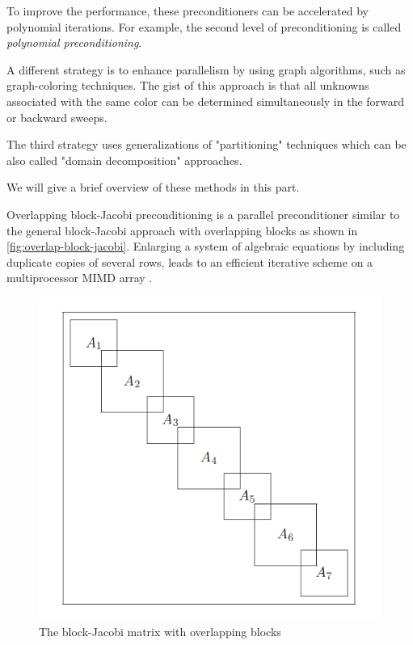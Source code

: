To improve the performance, these preconditioners can be accelerated by polynomial iterations. For example, the second level of preconditioning is called \textit{polynomial preconditioning}.

A different strategy is to enhance parallelism by using graph algorithms, such as graph-coloring techniques. The gist of this approach is that all unknowns associated with the same color can be determined simultaneously in the forward or backward sweeps.

The third strategy uses generalizations of "partitioning" techniques which can be also called "domain decomposition" approaches.

We will give a brief overview of these methods in this part.

Overlapping block-Jacobi preconditioning is a parallel preconditioner similar to the general block-Jacobi approach with overlapping blocks as shown in \autoref{fig:overlap-block-jacobi}. Enlarging a system of algebraic equations by including duplicate copies of several rows, leads to an efficient iterative scheme on a multiprocessor MIMD array \cite{WAIT1988325}. 
\begin{figure}[h!]
    \centering
    \includegraphics[width=\linewidth]{figures/block-jacobi.png}
    \caption{The block-Jacobi matrix with overlapping blocks \cite{saad2003iterative}}
    \label{fig:overlap-block-jacobi}
\end{figure}



